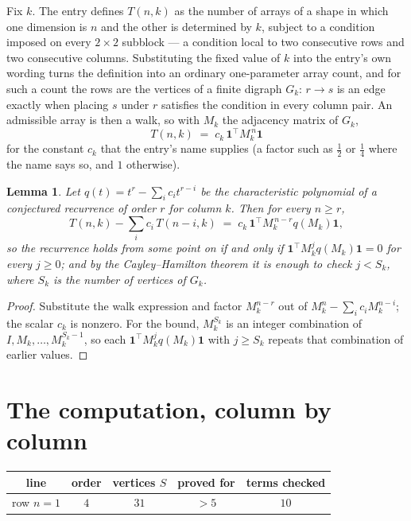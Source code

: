 \documentclass[11pt,a4paper]{article}
\theoremstyle{plain}
\newtheorem{lemma}[theorem]{Lemma}
\theoremstyle{definition}
\begin{document}
Fix $k$. The entry defines $T(n,k)$ as the number of arrays of a shape in which one dimension
is $n$ and the other is determined by $k$, subject to a condition imposed on every
$2\times2$ subblock --- a condition local to two consecutive rows and two consecutive columns.
Substituting the fixed value of $k$ into the entry's own wording turns the definition into an
ordinary one-parameter array count, and for such a count the rows are the vertices of a finite
digraph $G_k$: $r\to s$ is an edge exactly when placing $s$ under $r$ satisfies the condition
in every column pair. An admissible array is then a walk, so with $M_k$ the adjacency matrix
of $G_k$,
\[
T(n,k)\;=\;c_k\,\mathbf{1}^{\!\top}M_k^{\,n}\mathbf{1}
\]
for the constant $c_k$ that the entry's name supplies (a factor such as $\tfrac12$ or
$\tfrac14$ where the name says so, and $1$ otherwise).

\begin{lemma}\label{lem:crit}
Let $q(t)=t^{r}-\sum_i c_it^{r-i}$ be the characteristic polynomial of a conjectured
recurrence of order $r$ for column $k$. Then for every $n\ge r$,
\[
T(n,k)-\sum_i c_i\,T(n-i,k)\;=\;c_k\,\mathbf{1}^{\!\top}M_k^{\,n-r}q(M_k)\mathbf{1},
\]
so the recurrence holds from some point on if and only if
$\mathbf{1}^{\!\top}M_k^{j}q(M_k)\mathbf{1}=0$ for every $j\ge0$; and by the
Cayley--Hamilton theorem it is enough to check $j<S_k$, where $S_k$ is the number of vertices
of $G_k$.
\end{lemma}

\begin{proof}
Substitute the walk expression and factor $M_k^{n-r}$ out of $M_k^{n}-\sum_ic_iM_k^{n-i}$;
the scalar $c_k$ is nonzero. For the bound, $M_k^{S_k}$ is an integer combination of
$I,M_k,\dots,M_k^{S_k-1}$, so each $\mathbf{1}^{\!\top}M_k^{j}q(M_k)\mathbf{1}$ with
$j\ge S_k$ repeats that combination of earlier values.
\end{proof}

\section{The computation, column by column}

\begin{center}
\begin{tabular}{ccccc}
line & order & vertices $S$ & proved for & terms checked \\ \hline
row $n$$=1$ & $4$ & $31$ & $>5$ & $10$ \\
\end{tabular}
\end{center}
\end{document}

